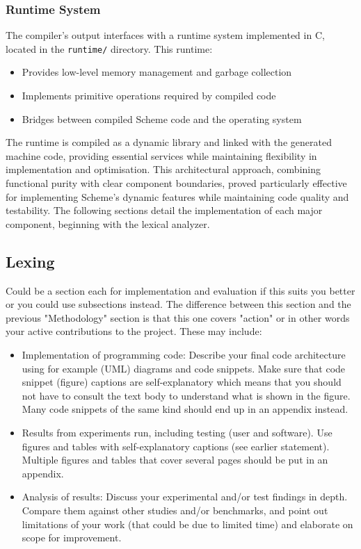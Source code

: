 \documentclass[final]{cmpreport_02}
\begin{document}
\subsubsection{Runtime System}
The compiler's output interfaces with a runtime system implemented in C, located in the \texttt{runtime/} directory. This runtime:
\begin{itemize}
\item Provides low-level memory management and garbage collection
\item Implements primitive operations required by compiled code
\item Bridges between compiled Scheme code and the operating system
\end{itemize}
The runtime is compiled as a dynamic library and linked with the generated machine code, providing essential services while maintaining flexibility in implementation and optimisation.
This architectural approach, combining functional purity with clear component boundaries, proved particularly effective for implementing Scheme's dynamic features while maintaining code quality and testability. The following sections detail the implementation of each major component, beginning with the lexical analyzer.


\subsection{Lexing}




Could be a section each for implementation and evaluation if this suits you better or you could use subsections instead. The difference between this section and the previous "Methodology" section is that this one covers "action" or in other words your active contributions to the project. These may include:
\begin{itemize}
\item Implementation of programming code: Describe your final code architecture using for example (UML) diagrams and code snippets. Make sure that code snippet (figure) captions are self-explanatory which means that you should not have to consult the text body to understand what is shown in the figure. Many code snippets of the same kind should end up in an appendix instead.
\item Results from experiments run, including testing (user and software). Use figures and tables with self-explanatory captions (see earlier statement). Multiple figures and tables that cover several pages should be put in an appendix.
\item Analysis of results: Discuss your experimental and/or test findings in depth. Compare them against other studies and/or benchmarks, and point out limitations of your work (that could be due to limited time) and elaborate on scope for improvement.
\end{itemize}
\end{document}
